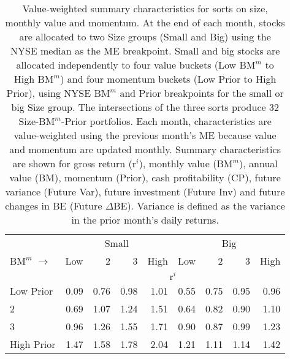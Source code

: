 
\begin{table}[!ht]
\scriptsize
\centering
\caption{
\scriptsize{
Value-weighted summary characteristics for sorts on size, monthly value and
momentum.
At the end of each month, stocks are allocated to two Size groups
(Small and Big) using the NYSE median as the ME breakpoint.
Small and big stocks are allocated independently to four value buckets (Low
$\text{BM}^m$ to High $\text{BM}^m$) and four momentum buckets
(Low Prior to High Prior), using NYSE $\text{BM}^m$ and Prior breakpoints for
the small or big Size group.
The intersections of the three sorts produce 32 Size-$\text{BM}^m$-Prior
portfolios.
Each month, characteristics are value-weighted using the previous month's ME
because value and momentum are updated monthly.
Summary characteristics are shown for
gross return ($\text{r}^i$),
monthly value ($\text{BM}^m$),
annual value (BM),
momentum (Prior),
cash profitability (CP),
future variance (Future Var),
future investment (Future Inv) and
future changes in BE (Future $\Delta$BE).
Variance is defined as the variance in the prior month's daily returns.
}
}
\begin{tabular}{lrrrrrrrr}
  \toprule
     & \multicolumn{4}{c}{Small} & \multicolumn{4}{c}{Big}  \\
     \cmidrule(r){2-5} \cmidrule(r){6-9}
    $\text{BM}^m$ $\rightarrow$ & Low & 2 & 3 & High & Low & 2 & 3 & High  \\ 
  \midrule
  
  
    & \multicolumn{8}{c}{$\text{r}^i$}  \\
     \cmidrule(r){2-5} \cmidrule(r){6-9}
    Low Prior  & 0.09  & 0.76  & 0.98  & 1.01  & 0.55  & 0.75  & 0.95  & 0.96   \\
    2  & 0.69  & 1.07  & 1.24  & 1.51  & 0.64  & 0.82  & 0.90  & 1.10   \\
    3  & 0.96  & 1.26  & 1.55  & 1.71  & 0.90  & 0.87  & 0.99  & 1.23   \\
    High Prior  & 1.47  & 1.58  & 1.78  & 2.04  & 1.21  & 1.11  & 1.14  & 1.42   \\
    
  
    

\end{tabular}
\end{table}
